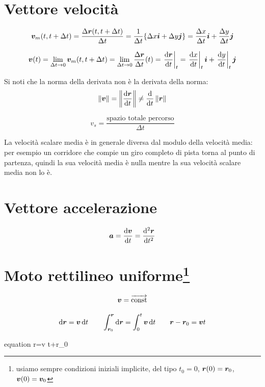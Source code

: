 \section{Vettore velocità}
\begin{Def}
  \[\boldsymbol{v}_m(t,t+\Delta t)=\frac{\Delta\boldsymbol{r}(t,t+\Delta t)}{\Delta
      t}=\frac{1}{\Delta t}\{\Delta x\boldsymbol{i}+\Delta y\boldsymbol{j}\}=\frac{\Delta x}{\Delta t}\boldsymbol{i}+\frac{\Delta y}{\Delta t}\boldsymbol{j}\]
\end{Def}
\begin{Def}
  \[\boldsymbol{v}(t)=\lim_{\Delta t\rightarrow 0}\boldsymbol{v}_m(t,t+\Delta t)=\lim_{\Delta t\rightarrow 0} \frac{\Delta\boldsymbol{r}}{\Delta t}(t)={\left.\frac{\mathrm{d} \boldsymbol{r}}{\mathrm{d} t}\right|_t}=\left.\frac{\mathrm{d} x}{\mathrm{d} t}\right|_t\boldsymbol{i}+\left.\frac{\mathrm{d} y}{\mathrm{d} t}\right|_t\boldsymbol{j}\]
\end{Def}
Si noti che la norma della derivata non è la derivata della norma:
\[\left\lVert\boldsymbol{v}\right\rVert=\left\lVert\frac{\mathrm{d}\boldsymbol{r}}{\mathrm{d} t}\right\rVert\neq\frac{\mathrm{d}}{\mathrm{d} t}\left\lVert\boldsymbol{r}\right\rVert\]
\begin{Def}
  \[v_s=\frac{\text{spazio totale percorso}}{\Delta t}\]
\end{Def}
La velocità scalare media è in generale diversa dal modulo della velocità media: per esempio un corridore che compie un giro completo di pista torna al punto di partenza, quindi la sua velocità media è nulla mentre la sua velocità scalare media non lo è.
\section{Vettore accelerazione}
\begin{Def}
  \[\boldsymbol{a}=\frac{\mathrm{d} \boldsymbol{v}}{\mathrm{d} t}={\frac{\mathrm{d}^2 \boldsymbol{r}}{\mathrm{d} t^2}}\]
\end{Def}
\section[Moto rettilineo uniforme]{Moto rettilineo uniforme\protect\footnote{usiamo sempre condizioni iniziali implicite, del tipo $t_0=0$, $\boldsymbol{r}(0)=\boldsymbol{r}_0$, $\boldsymbol{v}(0)=\boldsymbol{v}_0$}}
\begin{Def}
  \[\boldsymbol{v}=\overrightarrow{\text{const}}\]
\end{Def}
\[\mathrm{d}\boldsymbol{r}=\boldsymbol{v}\,\mathrm{d} t\qquad\int_{\boldsymbol{r}_0}^{\boldsymbol{r}}\mathrm{d}\boldsymbol{r}=\int_0^t\boldsymbol{v}\,\mathrm{d} t \qquad \boldsymbol{r}-\boldsymbol{r}_0=\boldsymbol{v} t\]
\begin{eqimp}{equation}
  \ve r=\ve v t+\ve r_0
\end{eqimp}
